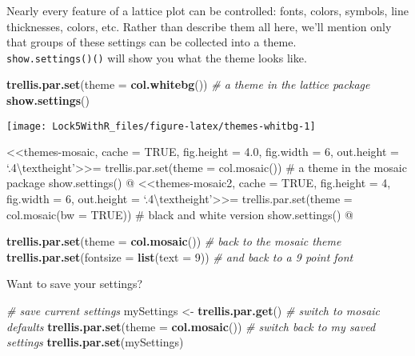 \documentclass[]{book}
\newenvironment{Shaded}{\begin{snugshade}}{\end{snugshade}}
\newcommand{\CommentTok}[1]{\textcolor[rgb]{0.56,0.35,0.01}{\textit{#1}}}
\newcommand{\DataTypeTok}[1]{\textcolor[rgb]{0.13,0.29,0.53}{#1}}
\newcommand{\DecValTok}[1]{\textcolor[rgb]{0.00,0.00,0.81}{#1}}
\newcommand{\KeywordTok}[1]{\textcolor[rgb]{0.13,0.29,0.53}{\textbf{#1}}}
\newcommand{\NormalTok}[1]{#1}
\newcommand{\StringTok}[1]{\textcolor[rgb]{0.31,0.60,0.02}{#1}}
\begin{document}
Nearly every feature of a lattice plot can be controlled: fonts, colors,
symbols, line thicknesses, colors, etc. Rather than describe them all here,
we'll mention only that groups of these settings
can be collected into a theme.\\
\texttt{show.settings()()} will show you what the theme looks like.

\begin{Shaded}
\begin{Highlighting}[]
\KeywordTok{trellis.par.set}\NormalTok{(}\DataTypeTok{theme =} \KeywordTok{col.whitebg}\NormalTok{())      }\CommentTok{# a theme in the lattice package}
\KeywordTok{show.settings}\NormalTok{()}
\end{Highlighting}
\end{Shaded}

\texttt{[image: Lock5WithR\_files/figure-latex/themes-whitbg-1]}

\newpage

\textless\textless themes-mosaic, cache = TRUE, fig.height = 4.0, fig.width = 6, out.height = `.4\textbackslash textheight'\textgreater\textgreater=
trellis.par.set(theme = col.mosaic()) \# a theme in the mosaic package
show.settings()
@
\textless\textless themes-mosaic2, cache = TRUE, fig.height = 4, fig.width = 6, out.height = `.4\textbackslash textheight'\textgreater\textgreater=
trellis.par.set(theme = col.mosaic(bw = TRUE)) \# black and white version
show.settings()
@

\begin{Shaded}
\begin{Highlighting}[]
\KeywordTok{trellis.par.set}\NormalTok{(}\DataTypeTok{theme =} \KeywordTok{col.mosaic}\NormalTok{())       }\CommentTok{# back to the mosaic theme}
\KeywordTok{trellis.par.set}\NormalTok{(}\DataTypeTok{fontsize =} \KeywordTok{list}\NormalTok{(}\DataTypeTok{text =} \DecValTok{9}\NormalTok{))    }\CommentTok{# and back to a 9 point font}
\end{Highlighting}
\end{Shaded}

Want to save your settings?

\begin{Shaded}
\begin{Highlighting}[]
\CommentTok{# save current settings}
\NormalTok{mySettings <-}\StringTok{ }\KeywordTok{trellis.par.get}\NormalTok{()}
\CommentTok{# switch to mosaic defaults}
\KeywordTok{trellis.par.set}\NormalTok{(}\DataTypeTok{theme =} \KeywordTok{col.mosaic}\NormalTok{())}
\CommentTok{# switch back to my saved settings}
\KeywordTok{trellis.par.set}\NormalTok{(mySettings)}
\end{Highlighting}
\end{Shaded}
\end{document}
